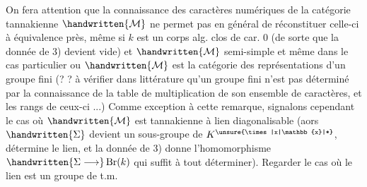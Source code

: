 
On fera attention que la connaissance des caractères numériques de la catégorie tannakienne $\handwritten{\mathcal{M}}$ ne permet pas en général de réconstituer celle-ci à équivalence près, même si $k$ est un corps alg. clos de car. 0 (de sorte que la donnée de 3) devient vide) et $\handwritten{\mathcal{M}}$ semi-simple
et même dans le cas particulier ou $\handwritten{\mathcal{M}}$ est la catégorie des représentations d'un groupe fini (? ? à vérifier dans littérature qu'un groupe fini n'est pas déterminé par la connaissance de la table de multiplication de  son ensemble de caractères, et les rangs de ceux-ci ...) Comme exception à cette remarque, signalons cependant le cas où $\handwritten{\mathcal{M}}$ est tannakienne à lien diagonalisable (aors $\handwritten{\Sigma}$ devient un sous-groupe de $K^{\unsure{\times|x|\mathbb{x}|*}}$,  détermine le lien, et la donnée de 3) donne l'homomorphisme $\handwritten{\Sigma\longrightarrow}\operatorname{Br}(k)$ qui suffit à tout déterminer). Regarder le cas où le lien est un groupe de t.m.

